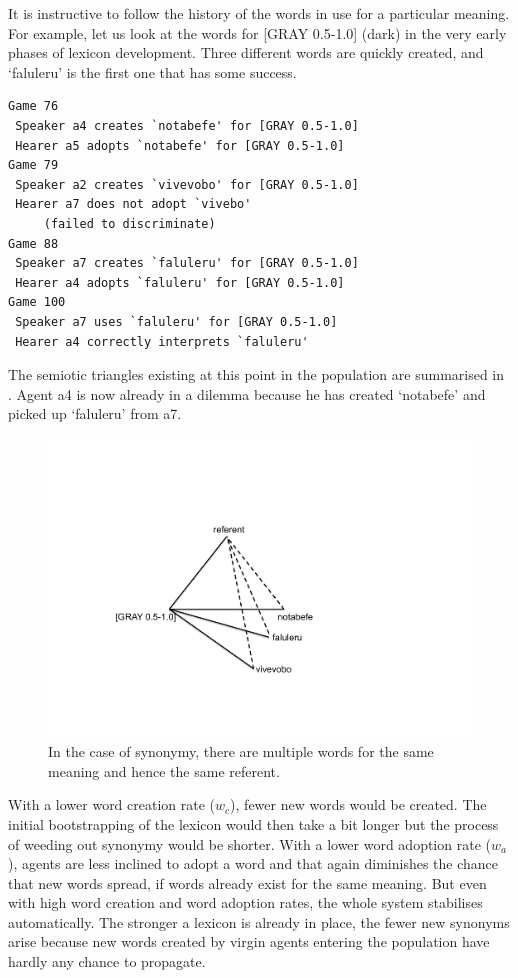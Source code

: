 It is instructive to follow the history of the words 
in use for a particular meaning. For 
example, let us look at the words for [GRAY 0.5-1.0] 
(dark) in the very early phases of lexicon development.
Three different words are quickly created, and 
`faluleru' is the first one that has some success. 
\begin{verbatim}
Game 76
 Speaker a4 creates `notabefe' for [GRAY 0.5-1.0]
 Hearer a5 adopts `notabefe' for [GRAY 0.5-1.0]
Game 79 
 Speaker a2 creates `vivevobo' for [GRAY 0.5-1.0]
 Hearer a7 does not adopt `vivebo' 
     (failed to discriminate)
Game 88 
 Speaker a7 creates `faluleru' for [GRAY 0.5-1.0]
 Hearer a4 adopts `faluleru' for [GRAY 0.5-1.0]
Game 100 
 Speaker a7 uses `faluleru' for [GRAY 0.5-1.0]
 Hearer a4 correctly interprets `faluleru'
\end{verbatim}
The semiotic triangles existing at this point in the population are 
summarised in . 
Agent {\bfshape  a4} is now already in a dilemma because he has created
`notabefe' and picked up `faluleru' from {\bfshape  a7}. 


\begin{figure}[htbp]
  \centerline{\includegraphics[width=.50\textwidth]{chap6/figs/triangle6}}
\caption{\label{triangle6} In the case of synonymy, 
there are multiple words for the same meaning and hence the 
same referent.}
\end{figure}

With a lower word creation rate ($w_{c}$), 
fewer new words would be created. The initial bootstrapping
of the lexicon would then take a bit longer but the 
process of weeding out synonymy would be shorter. 
With a lower word adoption rate ($w_{a}$), agents are
less inclined to adopt a word and that again diminishes
the chance that new words spread, if words already 
exist for the same meaning. But even with high word creation
and word adoption rates, the whole system stabilises automatically. 
The stronger a lexicon is already in place, the fewer
new synonyms arise because new words
created by virgin agents entering the population have hardly 
any chance to propagate. 

